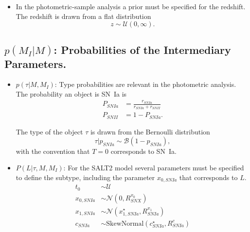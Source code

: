 \documentclass[preprint,3p]{elsarticle}
\begin{document}
\begin{itemize}
\item 
In the photometric-sample analysis a prior must be specified for the redshift.  The redshift is drawn from a flat distribution
\begin{equation}
z\sim \mathcal{U}(0,\infty).
\end{equation}
\end{itemize}

\subsection{$p(M_I|M)$: Probabilities of the Intermediary Parameters.}
\begin{itemize}
\item $p(\tau| M, M_I) $: Type probabilities are relevant in the photometric analysis.
The probability an object is SN~Ia is
\begin{align}
P_{SNIa} &= \frac{r_{SNIa}}{r_{SNIa}+r_{SNII}}  \\
P_{SNII}&=1-P_{SNIa}.
\label{prob:eqn}
\end{align}

The type of the object $\tau$ is drawn from the Bernoulli distribution 
\begin{equation}
\tau | p_{SNIa} \sim \mathcal{B}(1-p_{SNIa}),
\end{equation}
with the convention that $T=0$ corresponds to SN~Ia.

\item $P(L| \tau, M, M_I) $: 
For the SALT2 model several parameters
must be specified to define the subtype,
including the parameter $x_{0, SNIa}$ that corresponds to $L$.
\begin{align}
t_0 & \sim \mathcal{U}\\
x_{0, SNIa} & \sim \mathcal{N}(0,R^{x_0}_{SNX})\\
x_{1,SNIa} & \sim \mathcal{N}(x_{1,SNIa}^\star,R^{x_1}_{SNIa})\\
c_{SNIa} & \sim \text{SkewNormal}(c^\star_{SNIa},R^{c}_{SNIa} )
\end{align}
\end{itemize}
\end{document}
